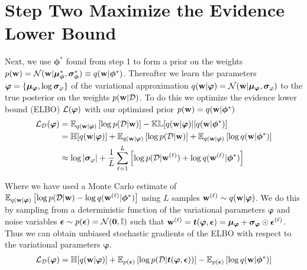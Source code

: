 \documentclass{article}
\begin{document}
\newpage

\section{Step Two Maximize the Evidence Lower Bound}

Next, we use $\bm \phi^*$ found from step 1 to form a prior on the weights  
$p( \mathbf{w} ) =\mathcal{N} (  \mathbf{w}  |  \bm \mu _{\bm \phi} ^*,  \bm \sigma _{\bm \phi}^*)\equiv q( \mathbf{w}  | \bm \phi^*)$. 
Thereafter we learn the parameters 
$\bm \varphi =\{ \bm \mu_{\tiny\bm \varphi} , \log \bm \sigma _{\tiny \varphi} \} $
of the variational approximation 
$q(\B w | \bm \varphi) = \N (\B w |\bm \mu_{\tiny\bm \varphi} , \bm \sigma _{\tiny \varphi} )$ 
to the true posterior on the weights $p( \mathbf{w}  |\mathcal{D} )$. 
To do this we optimize the evidence lower bound (ELBO) $\mathcal{L} (\bm \varphi )$ 
with our optimized prior $p( \mathbf{w}  ) = q ( \mathbf{w}  | \bm {\bm \phi}^*   ) $ 
\begin{align}
    \elbo _\D (\bm \varphi ) 
    &=  \E _{q (\B w | \bm \varphi)} \BB{ \log p (\D | \B w ) }  - 
        \kl [q (\B w | \bm \varphi) || q (\B w | \bm \bphi^*  ) ] \\ 
    &=  \entropy [ q (\B w | \bm \varphi)] + 
        \E _{q (\B w | \bm \varphi)} \BB{ \log p (\D | \B w )  } + 
        \E _{q (\B w | \bm \varphi)} \BB{ \log q (\B w | \bm \bphi^* ) } \\
    &\approx \log |\bm \sigma _{\tiny \varphi} | + 
         \frac{1}{L}\sum _{\ell=1} ^L \BB{ \log p (\D | \B w ^{(\ell)} )  + 
         \log q (\B w^{(\ell)}  | \bm \bphi^*  ) } 
\end{align}

Where we have used a Monte Carlo estimate of 
$ \mathbb{E} _{q ( \mathbf{w}  | \bm \varphi)} \left[ { \log p (\mathcal{D} |  \mathbf{w}  ) -\log q ( \mathbf{w} ^{(\ell)}  | \bm {\bm \phi}^*  )   } \right] $
using $L$ samples $ \mathbf{w}  ^{(\ell)} \sim  q ( \mathbf{w}  | \bm \varphi) $.
We do this by sampling from a deterministic function of the variational parameters $\bm \varphi$ and noise variables 
$\bm \epsilon \sim p(\bm \epsilon) = \mathcal{N} ( \mathbf{0}  , \mathbb{I})$ such that 
$ \mathbf{w}  ^{(\ell)} = \bm t(\bm \varphi, \bm \epsilon)= \bm \mu _{\bm \varphi} + \bm \sigma _{\bm \varphi} \odot \bm \epsilon ^{(\ell)} $.
Thus we can obtain unbiased stochastic gradients of the ELBO
with respect to the variational parameters $\bm \varphi$.
\begin{align}
    \mathcal{L} _{\mathcal{D}} (\bm \varphi ) 
    =  \mathbb{H} [ q ( \mathbf{w}  | \bm \varphi)] + 
        \mathbb{E} _{p(\bm \epsilon)} \left[ { \log p (\mathcal{D} | \bm t(\bm \varphi, \bm \epsilon) )  } \right] - 
        \mathbb{E} _{p(\bm \epsilon)} \left[ { \log q ( \mathbf{w}  | \bm {\bm \phi}^* ) } \right]
\end{align}
\end{document}
